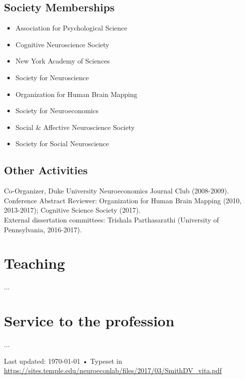\documentclass[11pt, letterpaper]{article}
\begin{document}
\subsection*{Society Memberships}
\begin{multicols}{2}
\begin{itemize}[noitemsep]
\item Association for Psychological Science
\item Cognitive Neuroscience Society
\item New York Academy of Sciences
\item Society for Neuroscience
\item Organization for Human Brain Mapping
\item Society for Neuroeconomics
\item Social \& Affective Neuroscience Society
\item Society for Social Neuroscience
\end{itemize}
\end{multicols}


\subsection*{Other Activities}
Co-Organizer, Duke University Neuroeconomics Journal Club (2008-2009). \\
Conference Abstract Reviewer: Organization for Human Brain Mapping (2010, 2013-2017); Cognitive Science Society (2017). \\
External dissertation committees: Trishala Parthasarathi (University of Pennsylvania, 2016-2017). \\


\section*{Teaching}

...

\section*{Service to the profession}

...
\vfill{}

\begin{center}
{\scriptsize  Last updated: \today\- •\- 
Typeset in \href{http://nitens.org/taraborelli/cvtex}{\XeTeX }\\
\href{https://sites.temple.edu/neuroeconlab/files/2017/03/SmithDV_vita.pdf}{https://sites.temple.edu/neuroeconlab/files/2017/03/SmithDV\_vita.pdf}}
\end{center}
\end{document}
